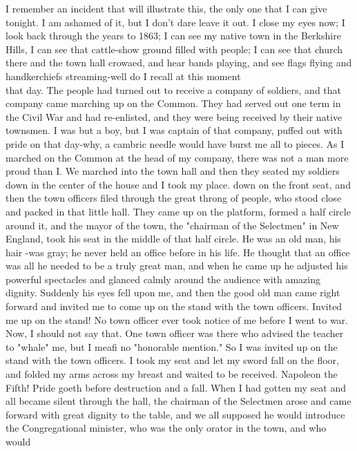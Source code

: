 \documentclass[10pt]{article}
\begin{document}
I remember an incident that will illustrate this, the only one that I can give tonight. I am ashamed of it, but I don't dare leave it out. I close my eyes now; I look back through the years to 1863; I can see my native town in the Berkshire Hills, I can see that cattle-show ground filled with people; I can see that church there and the town hall crowaed, and hear bands playing, and see flags flying and handkerchiefs streaming-well do I recall at this moment\\
that day. The people had turned out to receive a company of soldiers, and that company came marching up on the Common. They had served out one term in the Civil War and had re-enlisted, and they were being received by their native townsmen. I was but a boy, but I was captain of that company, puffed out with pride on that day-why, a cambric needle would have burst me all to pieces. As I marched on the Common at the head of my company, there was not a man more proud than I. We marched into the town hall and then they seated my soldiers down in the center of the house and I took my place. down on the front seat, and then the town officers filed through the great throng of people, who stood close and packed in that little hall. They came up on the platform, formed a half circle around it, and the mayor of the town, the "chairman of the Selectmen" in New England, took his seat in the middle of that half circle. He was an old man, his hair -was gray; he never held an office before in his life. He thought that an office was all he needed to be a truly great man, and when he came up he adjusted his powerful spectacles and glanced calmly around the audience with amazing dignity. Suddenly his eyes fell upon me, and then the good old man came right forward and invited me to come up on the stand with the town officers. Invited me up on the stand! No town officer ever took notice of me before I went to war. Now, I should not say that. One town officer was there who advised the teacher to "whale" me, but I meafi no "honorable mention." So I was invited up on the stand with the town officers. I took my seat and let my sword fall on the floor, and folded my arms across my breast and waited to be received. Napoleon the Fifth! Pride goeth before destruction and a fall. When I had gotten my seat and all became silent through the hall, the chairman of the Selectmen arose and came forward with great dignity to the table, and we all supposed he would introduce the Congregational minister, who was the only orator in the town, and who would\\
\end{document}
